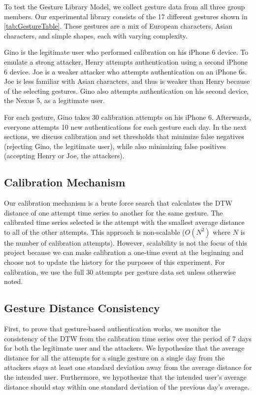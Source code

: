 To test the Gesture Library Model, we collect gesture data from all three group members. Our experimental library consists of the 17 different gestures shown in \autoref{tab:GestureTable}. These gestures are a mix of European characters, Asian characters, and simple shapes, each with varying complexity. 

Gino is the legitimate user who performed calibration on his iPhone 6 device. To emulate a strong attacker, Henry attempts authentication using a second iPhone 6 device. Joe is a weaker attacker who attempts authentication on an iPhone 6s. Joe is less familiar with Asian characters, and thus is weaker than Henry because of the selecting gestures. Gino also attempts authentication on his second device, the Nexus 5, as a legitimate user.

For each gesture, Gino takes 30 calibration attempts on his iPhone 6. Afterwards, everyone attempts 10 new authentications for each gesture each day. In the next sections, we discuss calibration and set thresholds that minimize false negatives (rejecting Gino, the legitimate user), while also minimizing false positives (accepting Henry or Joe, the attackers).

\subsection{Calibration Mechanism}

Our calibration mechanism is a brute force search that calculates the \gls{DTW} distance of one attempt time series to another for the same gesture. The calibrated time series selected is the attempt with the smallest average distance to all of the other attempts. This approach is non-scalable ($O(N^{2})$ where $N$ is the number of calibration attempts). However, scalability is not the focus of this project because we can make calibration a one-time event at the beginning and choose not to update the history for the purposes of this experiment. For calibration, we use the full 30 attempts per gesture data set unless otherwise noted.

\subsection{Gesture Distance Consistency}

First, to prove that gesture-based authentication works, we monitor the consistency of the \gls{DTW} from the calibration time series over the period of 7 days for both the legitimate user and the attackers. We hypothesize that the average distance for all the attempts for a single gesture on a single day from the attackers stays at least one standard deviation away from the average distance for the intended user. Furthermore, we hypothesize that the intended user's average distance should stay within one standard deviation of the previous day's average.

